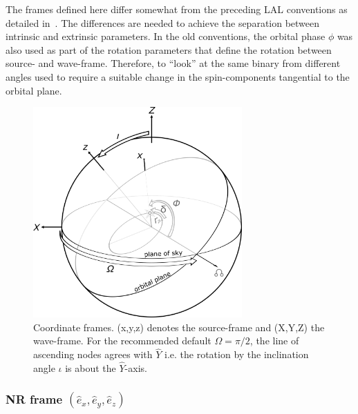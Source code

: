 \documentclass[11pt,tightenlines,article,amssymb,amsmath,amsfonts,superscriptaddress,nofootinbib]{revtex4}
\newcommand{\ExNR}{\hat e_x}
\newcommand{\EyNR}{\hat e_y}
\newcommand{\EzNR}{\hat e_z}
\newcommand{\EyW}{\hat Y}
\begin{document}
The frames defined here differ somewhat from the preceding LAL
conventions as detailed in~\cite{inspiral}.
The differences are needed to achieve the separation between intrinsic
and extrinsic parameters.  In the old conventions, the orbital phase
$\phi$ was also used as part of the rotation parameters that define
the rotation between source- and wave-frame.  Therefore, to ``look''
at the same binary from different angles used to require a suitable
change in the spin-components tangential to the orbital plane.


\begin{figure}
  \includegraphics[width=80mm]{NRinj_orbitalelements.png}
  \caption{
  \label{fig:frames} Coordinate frames.
  (x,y,z) denotes the source-frame and (X,Y,Z) the wave-frame. For the recommended default
    $\Omega=\pi/2$, the line of ascending nodes agrees with $\EyW$
    i.e. the rotation by the inclination angle $\iota$ is about the
    $\EyW$-axis.}
  \end{figure}


\subsubsection{NR frame \boldmath$(  \ExNR, \EyNR, \EzNR)$}
\end{document}
